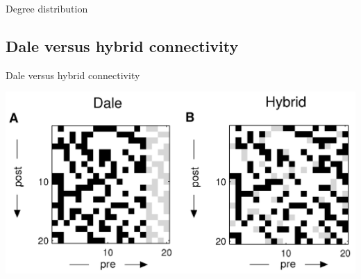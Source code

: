 \documentclass[fleqn]{beamer}
\newcommand{\pc}[1]{\setcounter{page}{#1}}
\begin{document}
\begin{frame}{Degree distribution}
\begin{minipage}{.48\linewidth}
\begin{center}
    \end{center}
\end{minipage}
    \begin{flushright}
      {\footnotesize \cite{Roxin2011}}
    \end{flushright}
\end{frame}

\subsection{Dale versus hybrid connectivity}
\pc{8}

\begin{frame}{Dale versus hybrid connectivity}
  \begin{center}
    \includegraphics[width=.7\textwidth]{figures/kriener_dale0}
  \end{center}
    \begin{flushright}
      {\footnotesize \cite{Kriener2008}}
    \end{flushright}
\end{frame}
\end{document}

